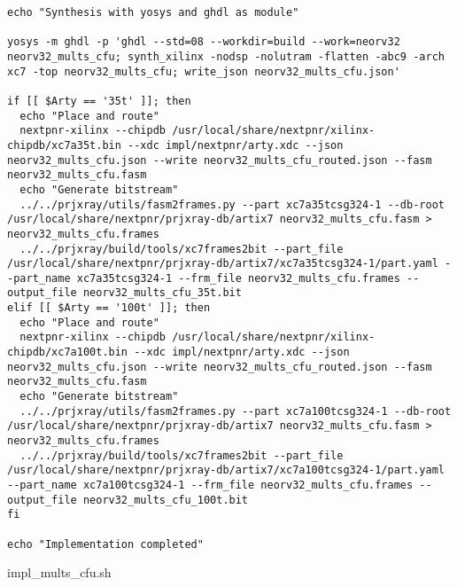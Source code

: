 \begin{code}
\begin{verbatim}
echo "Synthesis with yosys and ghdl as module"

yosys -m ghdl -p 'ghdl --std=08 --workdir=build --work=neorv32 neorv32_mults_cfu; synth_xilinx -nodsp -nolutram -flatten -abc9 -arch xc7 -top neorv32_mults_cfu; write_json neorv32_mults_cfu.json' 

if [[ $Arty == '35t' ]]; then
  echo "Place and route"
  nextpnr-xilinx --chipdb /usr/local/share/nextpnr/xilinx-chipdb/xc7a35t.bin --xdc impl/nextpnr/arty.xdc --json neorv32_mults_cfu.json --write neorv32_mults_cfu_routed.json --fasm neorv32_mults_cfu.fasm
  echo "Generate bitstream"
  ../../prjxray/utils/fasm2frames.py --part xc7a35tcsg324-1 --db-root /usr/local/share/nextpnr/prjxray-db/artix7 neorv32_mults_cfu.fasm > neorv32_mults_cfu.frames
  ../../prjxray/build/tools/xc7frames2bit --part_file /usr/local/share/nextpnr/prjxray-db/artix7/xc7a35tcsg324-1/part.yaml --part_name xc7a35tcsg324-1 --frm_file neorv32_mults_cfu.frames --output_file neorv32_mults_cfu_35t.bit
elif [[ $Arty == '100t' ]]; then
  echo "Place and route"
  nextpnr-xilinx --chipdb /usr/local/share/nextpnr/xilinx-chipdb/xc7a100t.bin --xdc impl/nextpnr/arty.xdc --json neorv32_mults_cfu.json --write neorv32_mults_cfu_routed.json --fasm neorv32_mults_cfu.fasm
  echo "Generate bitstream"
  ../../prjxray/utils/fasm2frames.py --part xc7a100tcsg324-1 --db-root /usr/local/share/nextpnr/prjxray-db/artix7 neorv32_mults_cfu.fasm > neorv32_mults_cfu.frames
  ../../prjxray/build/tools/xc7frames2bit --part_file /usr/local/share/nextpnr/prjxray-db/artix7/xc7a100tcsg324-1/part.yaml --part_name xc7a100tcsg324-1 --frm_file neorv32_mults_cfu.frames --output_file neorv32_mults_cfu_100t.bit
fi

echo "Implementation completed"
\end{verbatim}
\caption{impl\_mults\_cfu.sh}
\label{ap-cod:23}
\end{code}

